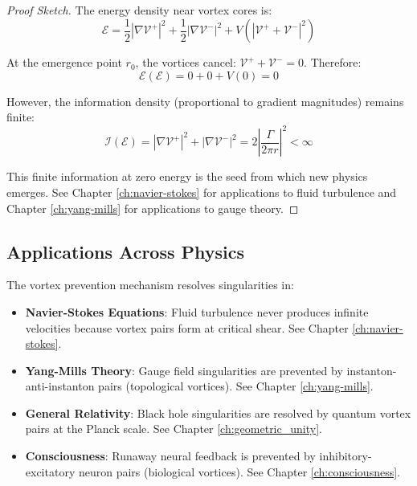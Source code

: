 \begin{proof}[Proof Sketch]
The energy density near vortex cores is:
\begin{equation}
\mathcal{E} = \frac{1}{2}|\nabla\mathcal{V}^+|^2 + \frac{1}{2}|\nabla\mathcal{V}^-|^2 + V(|\mathcal{V}^+ + \mathcal{V}^-|^2)
\end{equation}

At the emergence point $r_0$, the vortices cancel: $\mathcal{V}^+ + \mathcal{V}^- = 0$. Therefore:
\begin{equation}
\mathcal{E}(\mathcal{E}) = 0 + 0 + V(0) = 0
\end{equation}

However, the information density (proportional to gradient magnitudes) remains finite:
\begin{equation}
\mathcal{I}(\mathcal{E}) = |\nabla\mathcal{V}^+|^2 + |\nabla\mathcal{V}^-|^2 = 2\left|\frac{\Gamma}{2\pi r}\right|^2 < \infty
\end{equation}

This finite information at zero energy is the seed from which new physics emerges. See Chapter \ref{ch:navier-stokes} for applications to fluid turbulence and Chapter \ref{ch:yang-mills} for applications to gauge theory.
\end{proof}

\subsection{Applications Across Physics}

The vortex prevention mechanism resolves singularities in:

\begin{itemize}
\item \textbf{Navier-Stokes Equations}: Fluid turbulence never produces infinite velocities because vortex pairs form at critical shear. See Chapter \ref{ch:navier-stokes}.

\item \textbf{Yang-Mills Theory}: Gauge field singularities are prevented by instanton-anti-instanton pairs (topological vortices). See Chapter \ref{ch:yang-mills}.

\item \textbf{General Relativity}: Black hole singularities are resolved by quantum vortex pairs at the Planck scale. See Chapter \ref{ch:geometric_unity}.

\item \textbf{Consciousness}: Runaway neural feedback is prevented by inhibitory-excitatory neuron pairs (biological vortices). See Chapter \ref{ch:consciousness}.
\end{itemize}

